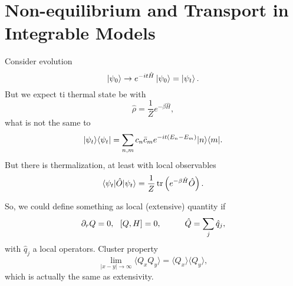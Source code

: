 \section{Non-equilibrium and Transport in Integrable Models}


Consider evolution
\begin{equation*}
	\left| \psi_0 \right\rangle \to e^{-i t \hat{H}} \left| \psi_0 \right\rangle = \left| \psi_t \right\rangle.
\end{equation*}
But we expect ti thermal state be with
\begin{equation*}
	\hat{\rho} = \frac{1}{Z} e^{- \beta \hat{H}},
\end{equation*}
what is not the same to
\begin{equation*}
	\kb{\psi_t}{\psi_t} = \sum_{n,m} c_n \bar{c}_m e^{-i t(E_n - E_m)} \kb{n}{m}.
\end{equation*}
But there is thermalization, at least with local observables
\begin{equation*}
	\bk{\psi_t}[\hat{O}]{\psi_t} = \frac{1}{Z} \tr\left(
		e^{- \beta \hat{H}} \hat{O}
	\right).
\end{equation*}


So, we could define something as local (extensive) quantity if
\begin{equation*}
	\partial_r Q = 0, \ \ [Q, H] = 0,
	\hspace{10 mm} 
	\hat{Q} = \sum_j \hat{q}_j,
\end{equation*}
with $\hat{q}_j$ a local operators. Cluster property
\begin{equation*}
	\lim_{|x-y|\to \infty} \langle Q_x Q_y\rangle = \langle Q_x\rangle \langle Q_y\rangle,
\end{equation*}
which is actually the same as extensivity.



